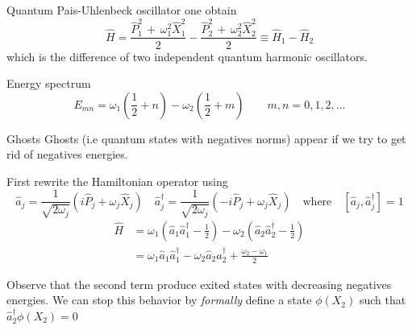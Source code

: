 \begin{frame}{Quantum Pais-Uhlenbeck oscillator}
  one obtain
  \begin{equation*}
    \hat{H} =
    \frac{\hat{P}_1^2 \, + \, \omega_1^2 \hat{X}_1^2}{2} -
    \frac{\hat{P}_2^2 \, + \, \omega_2^2 \hat{X}_2^2}{2} \equiv
    \hat{H}_1 - \hat{H}_2
  \end{equation*}
  which is the difference of two independent quantum harmonic oscillators.
  \vspace{1.5em}
  \begin{block}{Energy spectrum}
    \begin{equation*}
      E_{mn} =
      \omega_1 \left( \frac{1}{2} + n \right) -
      \omega_2 \left( \frac{1}{2} + m \right)
      \qquad m,n = 0,1,2,\ldots
    \end{equation*}
  \end{block}
\end{frame}

\begin{frame}{Ghosts}
  Ghosts (i.e quantum states with negatives norms) appear if we try to get rid
  of negatives energies.

  First rewrite the Hamiltonian operator using
  \begin{equation*}
    \hat{a}_j = \frac{1}{\sqrt{2\omega_j}}
      \left(i \hat{P}_j + \omega_j \hat{X}_j\right) \quad
    \hat{a}_j^{\dagger} = \frac{1}{\sqrt{2\omega_j}}
      \left(-i \hat{P}_j + \omega_j \hat{X}_j\right)
    \quad \text{where} \quad
    \left[ \hat{a}_j, \hat{a}_j^{\dagger} \right] = 1
  \end{equation*}
  \begin{align*}
    \hat{H} &=
      \omega_1 \left( \hat{a}_1 \hat{a}_1^{\dagger} - \frac{1}{2} \right) -
      \omega_2 \left( \hat{a}_2 \hat{a}_2^{\dagger} - \frac{1}{2} \right) \\
            &=
      \omega_1 \hat{a}_1 \hat{a}_1^{\dagger} -
      \omega_2 \hat{a}_2 \hat{a}_2^{\dagger} +
      \frac{\omega_2 - \omega_1}{2}
  \end{align*}

  Observe that the second term produce exited states with decreasing negatives
  energies. We can stop this behavior by \emph{formally} define a state
  $\phi(X_2)$ such that $\hat{a}_2^{\dagger} \phi(X_2) = 0$
\end{frame}

